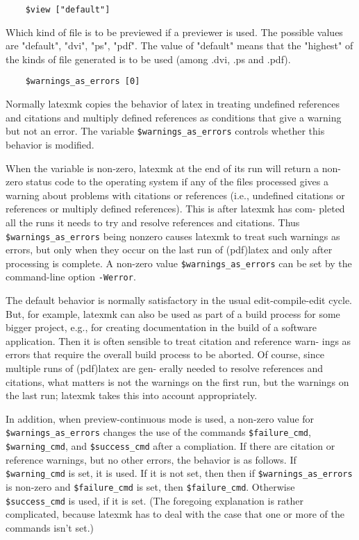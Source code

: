 \begin{verbatim}
	$view ["default"]
\end{verbatim}

Which kind of file is to be previewed if a  previewer  is  used.
The  possible  values  are  "default",  "dvi", "ps", "pdf".  The
value of "default" means that the "highest" of the kinds of file
generated is to be used (among .dvi, .ps and .pdf).

\begin{verbatim}
	$warnings_as_errors [0]
\end{verbatim}

Normally  latexmk copies the behavior of latex in treating undefined
references and citations and multiply  defined  references as  conditions  that
give a warning but not an error.  The variable \verb|$warnings_as_errors|
controls whether this behavior is modified.

When  the  variable  is  non-zero, latexmk at the end of its run will return a
non-zero status code to the  operating  system  if any  of  the files processed
gives a warning about problems with citations or references (i.e., undefined
citations or references or multiply defined references).  This is after latexmk
has com- pleted all the runs it needs to try and resolve  references  and
citations.   Thus  \verb|$warnings_as_errors|  being nonzero causes latexmk to treat
such warnings as errors, but only when they occur on  the last run of
(pdf)latex and only after processing is complete.  A non-zero value
\verb|$warnings_as_errors| can be set  by  the command-line option \verb|-Werror|.

The default behavior is normally satisfactory in the usual edit-compile-edit
cycle.  But, for example, latexmk can also be  used
as  part  of  a build process for some bigger project, e.g., for
creating documentation in the build of a  software  application.
Then  it is often sensible to treat citation and reference warn-
ings as errors that require the  overall  build  process  to  be
aborted.   Of course, since multiple runs of (pdf)latex are gen-
erally needed to resolve references and citations, what  matters
is  not  the  warnings on the first run, but the warnings on the
last run; latexmk takes this into account appropriately.

In addition, when preview-continuous mode is  used,  a  non-zero
value  for  \verb|$warnings_as_errors|  changes the use of the commands
\verb|$failure_cmd|, \verb|$warning_cmd|, and \verb|$success_cmd|  after  a
compliation.  If there are citation or reference warnings, but no other errors,
the behavior is as follows. If \verb|$warning_cmd| is  set,  it is  used.  If
it is not set, then then if \verb|$warnings_as_errors| is non-zero and
\verb|$failure_cmd| is set, then \verb|$failure_cmd|.   Otherwise
\verb|$success_cmd|  is used, if it is set.  (The foregoing explanation is
rather complicated, because latexmk has to deal with the case that one or more
of the commands isn't set.)

